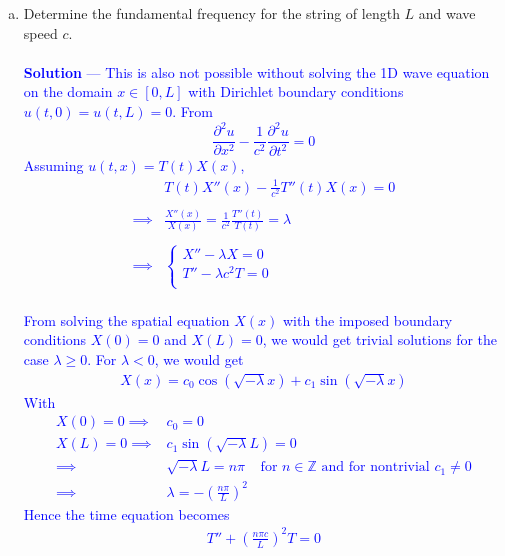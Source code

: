 \documentclass[12pt]{article}
\begin{document}
\begin{enumerate}[(a)]
{Besides $z_{n\geq 1,1} = 0$ (producing a "frequency" of $0$), the smallest meaningful (positive) value of $z_{n,m}$ is $z_{0,1}$—the first root of the zero-order Bessel function $J_0$. Thus, the fundamental frequency is 
$$\boxed{f = \frac{c z_{0,1}}{2\pi a}}$$ 
Or approximately $f = \frac{2.4048 c}{2 \pi a} = 0.3827 \frac{c}{a}$
}
\item Determine the fundamental frequency for the string of length $L$ and wave speed $c$. \\ \\  \textcolor{blue}{\textbf{Solution} — This is also not possible without solving the 1D wave equation on the domain $x \in [0,L]$ with Dirichlet boundary conditions $u(t,0) = u(t,L) = 0$. From 
$$\frac{\partial^2 u}{\partial x^2} - \frac{1}{c^2} \frac{\partial^2 u}{\partial t^2} = 0$$
Assuming $u(t,x) = T(t)X(x)$,
\begin{align*}
& T(t)X''(x) - \frac{1}{c^2} T''(t)X(x) = 0 \\ \\
\implies& \frac{X''(x)}{X(x)} = \frac{1}{c^2} \frac{T''(t)}{T(t)} = \lambda \\ \\
\implies& \begin{cases}
X'' - \lambda X = 0 \\
T'' - \lambda c^2 T = 0 \\
\end{cases}
\end{align*} \\
From solving the spatial equation $X(x)$ with the imposed boundary conditions $X(0) = 0$ and $X(L) = 0$, we would get trivial solutions for the case $\lambda \geq 0$. For $\lambda < 0$, we would get
\begin{align*}
X(x) = c_0 \cos \left( \sqrt{-\lambda} x \right) + c_1 \sin \left( \sqrt{-\lambda} x \right)
\end{align*}
With 
\begin{align*}
X(0) = 0 \implies& c_0 = 0 \\
X(L) = 0 \implies& c_1 \sin \left( \sqrt{-\lambda} L \right) = 0 \\
\implies&  \sqrt{-\lambda} L  = n\pi \;\;\;\; \text{for $n \in \mathbb{Z}$ and for nontrivial $c_1 \neq 0$} \\
\implies& \lambda = - \left( \frac{n\pi}{L} \right)^2
\end{align*}
Hence the time equation becomes
\begin{align*}
T'' + \left( \frac{n \pi c}{L} \right)^2 T = 0
\end{align*}
}
\end{enumerate}
\end{document}

